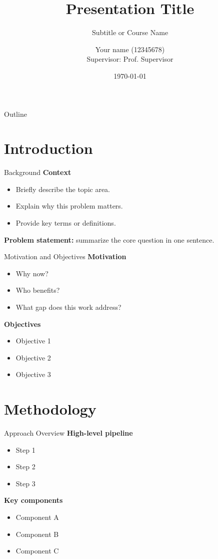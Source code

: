 \documentclass[aspectratio=169]{beamer}
\title[Presentation Title]{Presentation Title}
\subtitle{Subtitle or Course Name}
\author[Your name]{Your name (12345678) \\ Supervisor: Prof. Supervisor}
\institute[CityUHK]{City University of Hong Kong}
\date{\today}
\begin{document}
\nocite{*}

\begin{frame}
\titlepage
\end{frame}

\begin{frame}{Outline}
\tableofcontents
\end{frame}

\section{Introduction}

\begin{frame}{Background}
\textbf{Context}
\begin{itemize}
  \item Briefly describe the topic area.
  \item Explain why this problem matters.
  \item Provide key terms or definitions.
\end{itemize}

\vspace{0.5em}
\textbf{Problem statement:} summarize the core question in one sentence.
\end{frame}

\begin{frame}{Motivation and Objectives}
\textbf{Motivation}
\begin{itemize}
  \item Why now?
  \item Who benefits?
  \item What gap does this work address?
\end{itemize}

\vspace{0.5em}
\textbf{Objectives}
\begin{itemize}
  \item Objective 1
  \item Objective 2
  \item Objective 3
\end{itemize}
\end{frame}

\section{Methodology}

\begin{frame}{Approach Overview}
\textbf{High-level pipeline}
\begin{itemize}
  \item Step 1
  \item Step 2
  \item Step 3
\end{itemize}

\textbf{Key components}
\begin{itemize}
  \item Component A
  \item Component B
  \item Component C
\end{itemize}
\end{frame}
\end{document}
